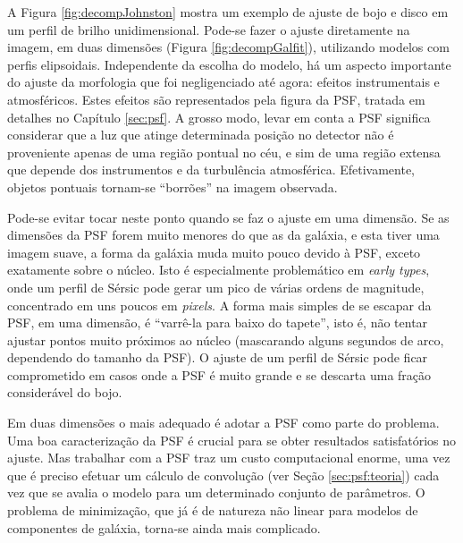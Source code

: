 A Figura \ref{fig:decompJohnston} mostra um exemplo de ajuste de bojo e disco em
um perfil de brilho unidimensional. Pode-se fazer o ajuste diretamente na
imagem, em duas dimensões (Figura \ref{fig:decompGalfit}), utilizando modelos
com perfis elipsoidais. Independente da escolha do modelo, há um aspecto
importante do ajuste da morfologia que foi negligenciado até agora: efeitos
instrumentais e atmosféricos. Estes efeitos são representados pela figura da
PSF, tratada em detalhes no Capítulo \ref{sec:psf}. A grosso modo, levar em
conta a PSF significa considerar que a luz que atinge determinada posição no
detector não é proveniente apenas de uma região pontual no céu, e sim de uma
região extensa que depende dos instrumentos e da turbulência atmosférica.
Efetivamente, objetos pontuais tornam-se ``borrões'' na imagem observada.

Pode-se evitar tocar neste ponto quando se faz o ajuste em uma dimensão.
Se as dimensões da PSF forem muito menores do que as da galáxia, e esta tiver
uma imagem suave, a forma da galáxia muda muito pouco devido à PSF, exceto
exatamente sobre o núcleo. Isto é especialmente problemático em {\em early
types}, onde um perfil de Sérsic pode gerar um pico de várias ordens de
magnitude, concentrado em uns poucos em {\em pixels}. A forma mais simples de se
escapar da PSF, em uma dimensão, é ``varrê-la para baixo do tapete'', isto é,
não tentar ajustar pontos muito próximos ao núcleo (mascarando alguns segundos
de arco, dependendo do tamanho da PSF). O ajuste de um perfil de Sérsic pode
ficar comprometido em casos onde a PSF é muito grande e se descarta uma fração
considerável do bojo.

Em duas dimensões o mais adequado é adotar a PSF como parte do problema. Uma boa
caracterização da PSF é crucial para se obter resultados satisfatórios no
ajuste. Mas trabalhar com a PSF traz um custo computacional enorme, uma vez que
é preciso efetuar um cálculo de convolução (ver Seção \ref{sec:psf:teoria}) cada
vez que se avalia o modelo para um determinado conjunto de parâmetros. O
problema de minimização, que já é de natureza não linear para modelos de
componentes de galáxia, torna-se ainda mais complicado.

